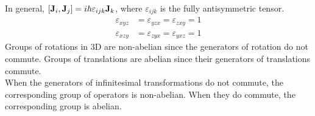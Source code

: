 \documentclass[12pt,a4paper,titlepage]{article}
\begin{document}
In general, $\comm{\vb{J}_{i}}{\vb{J}_{j}}=i\hbar\varepsilon_{ijk}\vb{J}_{k}$, where $\varepsilon_{ijk}$ is the fully antisymmetric tensor.
\begin{equation}
\begin{aligned}
\varepsilon_{xyz}&=\varepsilon_{yzx}=\varepsilon_{zxy}=1\\
\varepsilon_{xzy}&=\varepsilon_{zyx}=\varepsilon_{yxz}=1
\end{aligned}
\end{equation}
Groups of rotations in 3D are non-abelian since the generators of rotation do not commute. Groups of translations are abelian since their generators of translations commute.\\

When the generators of infinitesimal transformations do not commute, the corresponding group of operators is non-abelian. When they do commute, the corresponding group is abelian.
\end{document}
